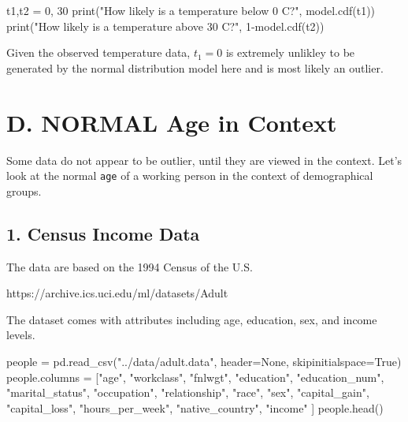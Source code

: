 \documentclass[
  letterpaper,
]{scrbook}
\newenvironment{Shaded}{\begin{snugshade}}{\end{snugshade}}
\newcommand{\BuiltInTok}[1]{\textcolor[rgb]{0.00,0.23,0.31}{#1}}
\newcommand{\DecValTok}[1]{\textcolor[rgb]{0.68,0.00,0.00}{#1}}
\newcommand{\NormalTok}[1]{\textcolor[rgb]{0.00,0.23,0.31}{#1}}
\newcommand{\OperatorTok}[1]{\textcolor[rgb]{0.37,0.37,0.37}{#1}}
\newcommand{\StringTok}[1]{\textcolor[rgb]{0.13,0.47,0.30}{#1}}
\newcommand{\VariableTok}[1]{\textcolor[rgb]{0.07,0.07,0.07}{#1}}
\begin{document}
\begin{Shaded}
\begin{Highlighting}[]
\NormalTok{t1,t2 }\OperatorTok{=} \DecValTok{0}\NormalTok{, }\DecValTok{30}
\BuiltInTok{print}\NormalTok{(}\StringTok{"How likely is a temperature below 0 C?"}\NormalTok{, model.cdf(t1))}
\BuiltInTok{print}\NormalTok{(}\StringTok{"How likely is a temperature above 30 C?"}\NormalTok{, }\DecValTok{1}\OperatorTok{{-}}\NormalTok{model.cdf(t2))}
\end{Highlighting}
\end{Shaded}

Given the observed temperature data, \(t_1=0\) is extremely unlikley to
be generated by the normal distribution model here and is most likely an
outlier.

\section*{D. NORMAL Age in Context}\label{d.-normal-age-in-context}


Some data do not appear to be outlier, until they are viewed in the
context. Let's look at the normal \texttt{age} of a working person in
the context of demographical groups.

\subsection*{1. Census Income Data}\label{census-income-data}

The data are based on the 1994 Census of the U.S.

https://archive.ics.uci.edu/ml/datasets/Adult

The dataset comes with attributes including age, education, sex, and
income levels.

\begin{Shaded}
\begin{Highlighting}[]
\NormalTok{people }\OperatorTok{=}\NormalTok{ pd.read\_csv(}\StringTok{"../data/adult.data"}\NormalTok{, header}\OperatorTok{=}\VariableTok{None}\NormalTok{, skipinitialspace}\OperatorTok{=}\VariableTok{True}\NormalTok{)}
\NormalTok{people.columns }\OperatorTok{=}\NormalTok{ [}\StringTok{"age"}\NormalTok{, }\StringTok{"workclass"}\NormalTok{, }\StringTok{"fnlwgt"}\NormalTok{, }\StringTok{"education"}\NormalTok{, }
                  \StringTok{"education\_num"}\NormalTok{, }\StringTok{"marital\_status"}\NormalTok{, }\StringTok{"occupation"}\NormalTok{, }
                  \StringTok{"relationship"}\NormalTok{, }\StringTok{"race"}\NormalTok{, }\StringTok{"sex"}\NormalTok{, }\StringTok{"capital\_gain"}\NormalTok{, }
                  \StringTok{"capital\_loss"}\NormalTok{, }\StringTok{"hours\_per\_week"}\NormalTok{, }\StringTok{"native\_country"}\NormalTok{,}
                  \StringTok{"income"}
\NormalTok{                 ]}
\NormalTok{people.head()}
\end{Highlighting}
\end{Shaded}
\end{document}

